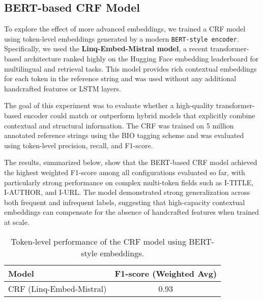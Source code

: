 \subsection{BERT-based CRF Model}
To explore the effect of more advanced embeddings, we trained a CRF model using token-level embeddings generated by a modern \texttt{BERT-style encoder}. Specifically, we used the \textbf{Linq-Embed-Mistral model}, a recent transformer-based architecture ranked highly on the Hugging Face embedding leaderboard for multilingual and retrieval tasks. This model provides rich contextual embeddings for each token in the reference string and was used without any additional handcrafted features or LSTM layers.

The goal of this experiment was to evaluate whether a high-quality transformer-based encoder could match or outperform hybrid models that explicitly combine contextual and structural information. The CRF was trained on 5 million annotated reference strings using the BIO tagging scheme and was evaluated using token-level precision, recall, and F1-score.

The results, summarized below, show that the BERT-based CRF model achieved the highest weighted F1-score among all configurations evaluated so far, with particularly strong performance on complex multi-token fields such as I-TITLE, I-AUTHOR, and I-URL. The model demonstrated strong generalization across both frequent and infrequent labels, suggesting that high-capacity contextual embeddings can compensate for the absence of handcrafted features when trained at scale.

\begin{table}[h]
    \centering
    \begin{tabular}{|l|c|}
    \hline
    \textbf{Model} & \textbf{F1-score (Weighted Avg)} \\
    \hline
    CRF (Linq-Embed-Mistral) & 0.93 \\
    \hline
    \end{tabular}
    \caption{Token-level performance of the CRF model using BERT-style embeddings.}
    \label{tab:bert_crf}
\end{table}

